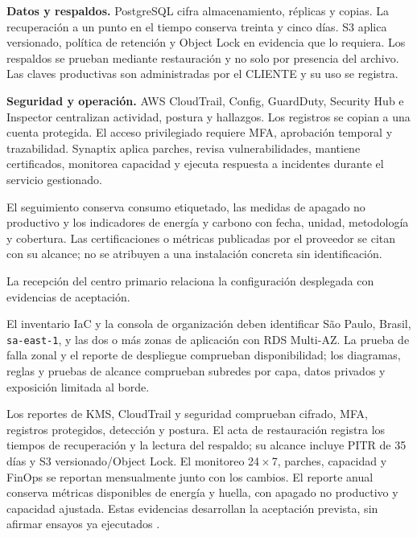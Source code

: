 \textbf{Datos y respaldos.} PostgreSQL cifra almacenamiento, réplicas y copias. La recuperación a un punto en el tiempo conserva treinta y cinco días. S3 aplica versionado, política de retención y Object Lock en evidencia que lo requiera. Los respaldos se prueban mediante restauración y no solo por presencia del archivo. Las claves productivas son administradas por el CLIENTE y su uso se registra.

\textbf{Seguridad y operación.} AWS CloudTrail, Config, GuardDuty, Security Hub e Inspector centralizan actividad, postura y hallazgos. Los registros se copian a una cuenta protegida. El acceso privilegiado requiere MFA, aprobación temporal y trazabilidad. Synaptix aplica parches, revisa vulnerabilidades, mantiene certificados, monitorea capacidad y ejecuta respuesta a incidentes durante el servicio gestionado.



El seguimiento conserva consumo etiquetado, las medidas de apagado no productivo y los indicadores de energía y carbono con fecha, unidad, metodología y cobertura. Las certificaciones o métricas publicadas por el proveedor se citan con su alcance; no se atribuyen a una instalación concreta sin identificación.

La recepción del centro primario relaciona la configuración desplegada con evidencias de aceptación.

El inventario IaC y la consola de organización deben identificar São Paulo, Brasil, \texttt{sa-east-1}, y las dos o más zonas de aplicación con RDS Multi-AZ. La prueba de falla zonal y el reporte de despliegue comprueban disponibilidad; los diagramas, reglas y pruebas de alcance comprueban subredes por capa, datos privados y exposición limitada al borde.

Los reportes de KMS, CloudTrail y seguridad comprueban cifrado, MFA, registros protegidos, detección y postura. El acta de restauración registra los tiempos de recuperación y la lectura del respaldo; su alcance incluye PITR de 35 días y S3 versionado/Object Lock. El monitoreo 24\,$\times$\,7, parches, capacidad y FinOps se reportan mensualmente junto con los cambios. El reporte anual conserva métricas disponibles de energía y huella, con apagado no productivo y capacidad ajustada. Estas evidencias desarrollan la aceptación prevista, sin afirmar ensayos ya ejecutados \parencites[art.~16, pp.~11--12; art.~20, pp.~14--15]{pucv-admin}[cap.~3, pp.~8--10; cap.~6, pp.~14--17; cap.~10, p.~22; secc.~15.1, pp.~27--28]{pucv-transversal}{aws-regiones,aws-reliability}.

